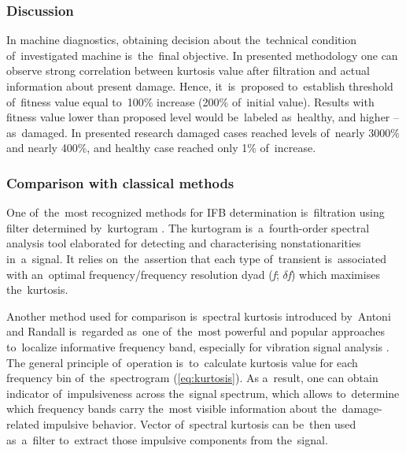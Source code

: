 \subsubsection{Discussion}

In machine diagnostics, obtaining decision about the~technical condition of~investigated machine is~the~final objective. In presented methodology one can observe strong correlation between kurtosis value after filtration and actual information about present damage. Hence, it~is~proposed to~establish threshold of~fitness value equal to~100$\%$ increase (200$\%$ of~initial value). Results with fitness value lower than proposed level would be~labeled as~healthy, and higher – as~damaged. In presented research damaged cases reached levels of~nearly 3000$\%$ and nearly 400$\%$, and healthy case reached only 1$\%$ of~increase.

\subsubsection{Comparison with classical methods}

One of~the~most recognized methods for IFB determination is~filtration using filter determined by~kurtogram \cite{antoni2007fast}. The kurtogram is~a~fourth-order spectral analysis tool elaborated for detecting and characterising nonstationarities in~a~signal. It relies on~the~assertion that each type of~transient is~associated with an~optimal frequency/frequency resolution dyad (\textit{f}; $\delta$\textit{f}) which maximises the~kurtosis.

Another method used for comparison is~spectral kurtosis introduced by~Antoni and Randall \cite{antoni2006spectral} is~regarded as~one of~the~most powerful and popular approaches to~localize informative frequency band, especially for vibration signal analysis \cite{randall2011rolling}. The general principle of~operation is~to~calculate kurtosis value for each frequency bin of~the~spectrogram (\ref{eq:kurtosis}). As a~result, one can obtain indicator of~impulsiveness across the~signal spectrum, which allows to~determine which frequency bands carry the~most visible information about the~damage-related impulsive behavior. Vector of~spectral kurtosis can be~then used as~a~filter to~extract those impulsive components from the~signal.






